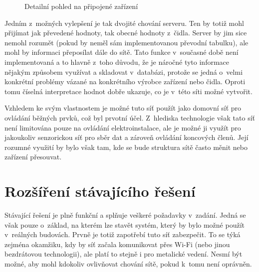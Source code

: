\begin{figure}[h]
    \centering
	\caption{Detailní pohled na připojené zařízení}
	\label{fig:speedy2}
\end{figure}

Jedním z~možných vylepšení je tak dvojité chování serveru. Ten by totiž mohl přijímat jak převedené hodnoty, tak obecné hodnoty z~čidla. Server by jim sice nemohl rozumět (pokud by neměl sám implementovanou převodní tabulku), ale mohl by informaci přeposílat dále do sítě. Tato funkce v~současné době není implementovaná a to hlavně z~toho důvodu, že je náročné tyto informace nějakým způsobem využívat a skladovat v~databázi, protože se jedná o~velmi konkrétní problémy vázané na konkrétního výrobce zařízení nebo čidla. Oproti tomu číselná interpretace hodnot dobře ukazuje, co je v~této síti možné vytvořit.

Vzhledem ke svým vlastnostem je možné tuto síť použít jako domovní síť pro ovládání běžných prvků, což byl prvotní účel. Z~hlediska technologie však tato síť není limitována pouze na ovládání elektroinstalace, ale je možné ji využít pro jakoukoliv senzorickou síť pro sběr dat a zároveň ovládání koncových členů. Její rozumné využití by bylo však tam, kde se bude struktura sítě často měnit nebo zařízení přesouvat.

\chapter{Rozšíření stávajícího řešení}
Stávající řešení je plně funkční a splňuje veškeré požadavky v~zadání. Jedná se však pouze o~základ, na kterém lze stavět systém, který by bylo možné použít v~reálných budovách. Prvně je totiž zapotřebí tuto síť zabezpečit. To se týká zejména okamžiku, kdy by síť začala komunikovat přes Wi-Fi  (nebo jinou bezdrátovou technologii), ale platí to stejně i pro metalické vedení. Nesmí být možné, aby mohl kdokoliv ovlivňovat chování sítě, pokud k~tomu není oprávněn.

